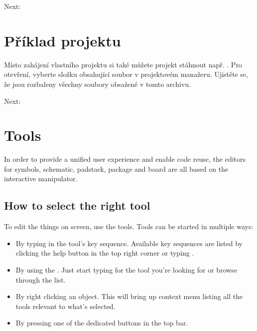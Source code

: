 \documentclass[letterpaper,10pt,czech]{sphinxmanual}
\begin{document}
\noindent{}

Next: {\hyperref[\detokenize{example-project::doc}]{}}


\chapter{Příklad projektu}
\label{\detokenize{example-project:priklad-projektu}}\label{\detokenize{example-project::doc}}
Místo zahájení vlastního projektu si také můžete projekt stáhnout např. . Pro otevření, vyberte složku obsahující soubor  v projektovém manažeru. Ujistěte se, že jsou rozbaleny všechny soubory obsažené v tomto archivu.

Next: {\hyperref[\detokenize{tools::doc}]{}}


\chapter{Tools}
\label{\detokenize{tools:tools}}\label{\detokenize{tools::doc}}
In order to provide a unified user experience and enable code reuse, the
editors for symbols, schematic, padstack, package and board are all
based on the interactive manipulator.


\section{How to select the right tool}
\label{\detokenize{tools:how-to-select-the-right-tool}}
To edit the things on screen, use the tools. Tools can be started in
multiple ways:
\begin{itemize}
\item {} 
By typing in the tool’s key sequence. Available key sequences are
listed by clicking the help button in the top right corner or typing
.

\item {} 
By using the {\hyperref[\detokenize{spacebar-menu::doc}]{}}.
Just start typing for the tool you’re looking for or browse through
the list.

\item {} 
By right clicking an object. This will bring up context menu listing
all the tools relevant to what’s selected.

\item {} 
By pressing one of the dedicated buttons in the top bar.

\end{itemize}
\end{document}
